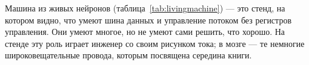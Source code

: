 Машина из живых нейронов (таблица~\ref{tab:livingmachine}) --- это стенд, на котором видно, что умеют шина данных и управление потоком без регистров управления. Они умеют многое, но не умеют сами решить, что хорошо. На стенде эту роль играет инженер со своим рисунком тока; в мозге --- те немногие широковещательные провода, которым посвящена середина книги.
